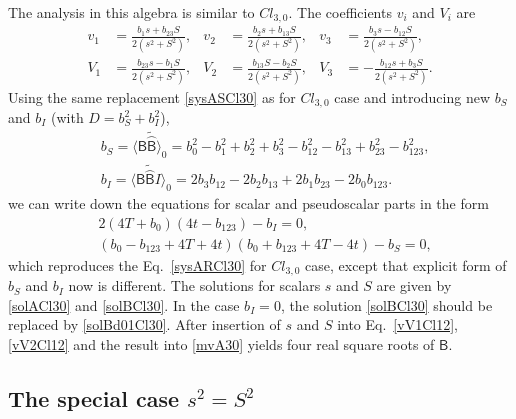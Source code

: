 \documentclass{birkjour}
\newcommand{\cl}[2]{\ensuremath{\mathit{Cl}_{#1,#2}}}
\newcommand{\cliffordconjugate}[1]{\widetilde{\wideparen{#1}}}
\def\B{\mathsf{B}}
\begin{document}
The analysis in this algebra is similar to \cl{3}{0}. The
coefficients $v_i$ and $V_i$ are
\begin{align}
v_1&=\frac{b_1s+b_{23}S}{2(s^2+S^2)},
   &v_2&=\frac{b_{2}s+b_{13}S}{2(s^2+S^2)},
    &v_3&=\frac{b_3 s -b_{12}S}{2(s^2+S^2)}, \label{vV1Cl12} \\
V_1&=\frac{b_{23}s-b_{1}S}{2(s^2+S^2)},
&V_2&=\frac{b_{13}S-b_{2}S}{2(s^2+S^2)},
&V_3&=-\frac{b_{12}s+b_{3}S}{2(s^2+S^2)}.\label{vV2Cl12}
\end{align}
Using the same replacement \eqref{sysASCl30} as  for \cl{3}{0}
case and introducing new  $b_{S}$ and $b_{I}$ (with
$D=b_{S}^2+b_{I}^2$),
\begin{equation}\label{bSbICl12}
\begin{split}
&b_{S}= \langle \B \cliffordconjugate{\B}\rangle_0 =
b_{0}^2-b_{1}^2+b_{2}^2+b_{3}^2-b_{12}^2-b_{13}^2+b_{23}^2-b_{123}^2,\\
&b_{I}= \langle \B \cliffordconjugate{\B} I \rangle_0 = 2 b_{3}
b_{12}-2 b_{2} b_{13}+2 b_{1} b_{23}-2 b_{0} b_{123}.
\end{split}
\end{equation}
we can write down the equations for scalar and pseudoscalar parts
in the form
\begin{equation}\label{sysARCl12}
\begin{split}
&2(4 T + b_{0}) (4 t -b_{123}) - b_{I}=0,\\
  &(b_0-b_{123}+4 T+4 t) (b_{0}+b_{123}+4 T-4 t)-b_{S}=0,
\end{split}\end{equation}
which reproduces the Eq.~\eqref{sysARCl30} for \cl{3}{0} case,
except that explicit form of $b_S$ and $b_I$ now is different. The
solutions for scalars $s$ and $S$ are given by \eqref{solACl30}
and \eqref{solBCl30}.  In the case $b_I=0$, the solution
\eqref{solBCl30} should be replaced by \eqref{solBd01Cl30}. After
insertion of  $s$ and $S$  into Eq.~\eqref{vV1Cl12},
\eqref{vV2Cl12} and  the result into \eqref{mvA30} yields four
real square roots of $\B$.


\subsection{The special case $s^2 = S^2$}
\end{document}
